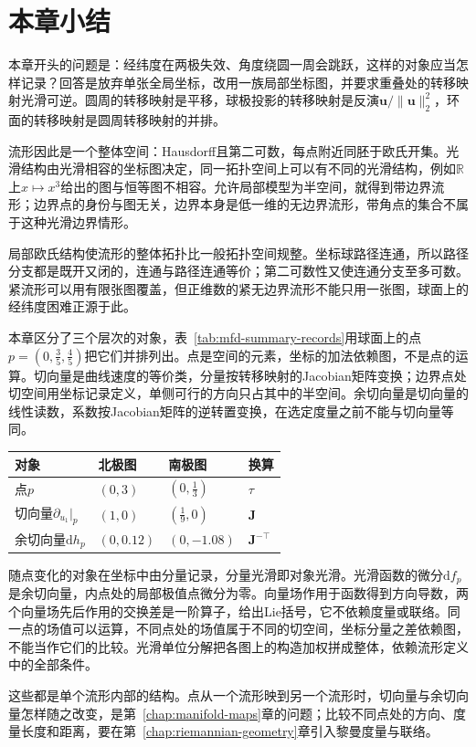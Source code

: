 \section{本章小结}
\label{sec:mfd-summary}

本章开头的问题是：经纬度在两极失效、角度绕圆一周会跳跃，这样的对象应当怎样记录？回答是放弃单张全局坐标，改用一族局部坐标图，并要求重叠处的转移映射光滑可逆。圆周的转移映射是平移，球极投影的转移映射是反演$\bm u/\lVert\bm u\rVert_2^2$，环面的转移映射是圆周转移映射的并排。

流形因此是一个整体空间：Hausdorff且第二可数，每点附近同胚于欧氏开集。光滑结构由光滑相容的坐标图决定，同一拓扑空间上可以有不同的光滑结构，例如$\mathbb R$上$x\mapsto x^3$给出的图与恒等图不相容。允许局部模型为半空间，就得到带边界流形；边界点的身份与图无关，边界本身是低一维的无边界流形，带角点的集合不属于这种光滑边界情形。

局部欧氏结构使流形的整体拓扑比一般拓扑空间规整。坐标球路径连通，所以路径分支都是既开又闭的，连通与路径连通等价；第二可数性又使连通分支至多可数。紧流形可以用有限张图覆盖，但正维数的紧无边界流形不能只用一张图，球面上的经纬度困难正源于此。

本章区分了三个层次的对象，表~\ref{tab:mfd-summary-records}用球面上的点$p=(0,\tfrac35,\tfrac45)$把它们并排列出。点是空间的元素，坐标的加法依赖图，不是点的运算。切向量是曲线速度的等价类，分量按转移映射的Jacobian矩阵变换；边界点处切空间用坐标记录定义，单侧可行的方向只占其中的半空间。余切向量是切向量的线性读数，系数按Jacobian矩阵的逆转置变换，在选定度量之前不能与切向量等同。

\begin{BookInlineTable}
  \centering
  \begin{tabular}{llll}
    \toprule
    对象 & 北极图 & 南极图 & 换算\\
    \midrule
    点$p$ & $(0,3)$ & $(0,\tfrac13)$ & $\tau$\\
    切向量$\partial_{u_1}|_p$ & $(1,0)$ & $(\tfrac19,0)$ & $\bm J$\\
    余切向量$\mathrm dh_p$ & $(0,0.12)$ & $(0,-1.08)$ & $\bm J^{-\top}$\\
    \bottomrule
  \end{tabular}
  \caption{球面上同一组对象在两张图中的记录，其中$\bm J=\operatorname{diag}(\tfrac19,-\tfrac19)$。}
  \label{tab:mfd-summary-records}
\end{BookInlineTable}

随点变化的对象在坐标中由分量记录，分量光滑即对象光滑。光滑函数的微分$\mathrm df_p$是余切向量，内点处的局部极值点微分为零。向量场作用于函数得到方向导数，两个向量场先后作用的交换差是一阶算子，给出Lie括号，它不依赖度量或联络。同一点的场值可以运算，不同点处的场值属于不同的切空间，坐标分量之差依赖图，不能当作它们的比较。光滑单位分解把各图上的构造加权拼成整体，依赖流形定义中的全部条件。

这些都是单个流形内部的结构。点从一个流形映到另一个流形时，切向量与余切向量怎样随之改变，是第~\ref{chap:manifold-maps}章的问题；比较不同点处的方向、度量长度和距离，要在第~\ref{chap:riemannian-geometry}章引入黎曼度量与联络。
